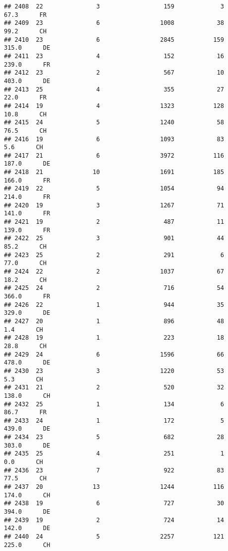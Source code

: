 \documentclass[
]{article}
\begin{document}
\begin{verbatim}
## 2408  22               3                  159             3     67.3      FR
## 2409  23               6                 1008            38     99.2      CH
## 2410  23               6                 2845           159    315.0      DE
## 2411  23               4                  152            16    239.0      FR
## 2412  23               2                  567            10    403.0      DE
## 2413  25               4                  355            27     22.0      FR
## 2414  19               4                 1323           128     10.8      CH
## 2415  24               5                 1240            58     76.5      CH
## 2416  19               6                 1093            83      5.6      CH
## 2417  21               6                 3972           116    187.0      DE
## 2418  21              10                 1691           185    166.0      FR
## 2419  22               5                 1054            94    214.0      FR
## 2420  19               3                 1267            71    141.0      FR
## 2421  19               2                  487            11    139.0      FR
## 2422  25               3                  901            44     85.2      CH
## 2423  25               2                  291             6     77.0      CH
## 2424  22               2                 1037            67     18.2      CH
## 2425  24               2                  716            54    366.0      FR
## 2426  22               1                  944            35    329.0      DE
## 2427  20               1                  896            48      1.4      CH
## 2428  19               1                  223            18     28.8      CH
## 2429  24               6                 1596            66    478.0      DE
## 2430  23               3                 1220            53      5.3      CH
## 2431  21               2                  520            32    138.0      CH
## 2432  25               1                  134             6     86.7      FR
## 2433  24               1                  172             5    439.0      DE
## 2434  23               5                  682            28    303.0      DE
## 2435  25               4                  251             1      0.0      CH
## 2436  23               7                  922            83     77.5      CH
## 2437  20              13                 1244           116    174.0      CH
## 2438  19               6                  727            30    394.0      DE
## 2439  19               2                  724            14    142.0      DE
## 2440  24               5                 2257           121    225.0      CH

\end{verbatim}
\end{document}
